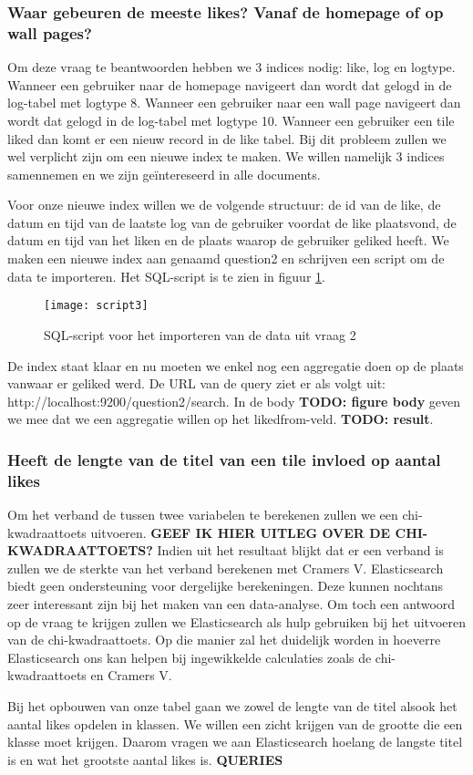 \subsubsection{Waar gebeuren de meeste likes? Vanaf de homepage of op wall pages?}
Om deze vraag te beantwoorden hebben we 3 indices nodig: like, log en logtype. Wanneer een gebruiker naar de homepage navigeert dan wordt dat gelogd in de log-tabel met logtype 8. Wanneer een gebruiker naar een wall page navigeert dan wordt dat gelogd in de log-tabel met logtype 10. Wanneer een gebruiker een tile liked dan komt er een nieuw record in de like tabel. Bij dit probleem zullen we wel verplicht zijn om een nieuwe index te maken. We willen namelijk 3 indices samennemen en we zijn geïntereseerd in alle documents.

Voor onze nieuwe index willen we de volgende structuur: de id van de like, de datum en tijd van de laatste log van de gebruiker voordat de like plaatsvond, de datum en tijd van het liken en de plaats waarop de gebruiker geliked heeft. We maken een nieuwe index aan genaamd question2 en schrijven een script om de data te importeren. Het SQL-script is te zien in figuur \ref{fig:script3}.

\begin{figure}
	\centering
	\texttt{[image: script3]}
	\caption{SQL-script voor het importeren van de data uit vraag 2}
	\label{fig:script3}
\end{figure}

De index staat klaar en nu moeten we enkel nog een aggregatie doen op de plaats vanwaar er geliked werd. De URL van de query ziet er als volgt uit: http://localhost:9200/question2/\textunderscore search. In de body \textbf{TODO: figure body} geven we mee dat we een aggregatie willen op het liked\textunderscore from-veld. \textbf{TODO: result}.

\subsubsection{Heeft de lengte van de titel van een tile invloed op aantal likes}

Om het verband de tussen twee variabelen te berekenen zullen we een chi-kwadraattoets uitvoeren. \textbf{GEEF IK HIER UITLEG OVER DE CHI-KWADRAATTOETS?} Indien uit het resultaat blijkt dat er een verband is zullen we de sterkte van het verband berekenen met Cramers V. Elasticsearch biedt geen ondersteuning voor dergelijke berekeningen. Deze kunnen nochtans zeer interessant zijn bij het maken van een data-analyse. Om toch een antwoord op de vraag te krijgen zullen we Elasticsearch als hulp gebruiken bij het uitvoeren van de chi-kwadraattoets. Op die manier zal het duidelijk worden in hoeverre Elasticsearch ons kan helpen bij ingewikkelde calculaties zoals de chi-kwadraattoets en Cramers V. 

Bij het opbouwen van onze tabel gaan we zowel de lengte van de titel alsook het aantal likes opdelen in klassen. We willen een zicht krijgen van de grootte die een klasse moet krijgen. Daarom vragen we aan Elasticsearch hoelang de langste titel is en wat het grootste aantal likes is. \textbf{QUERIES} 
